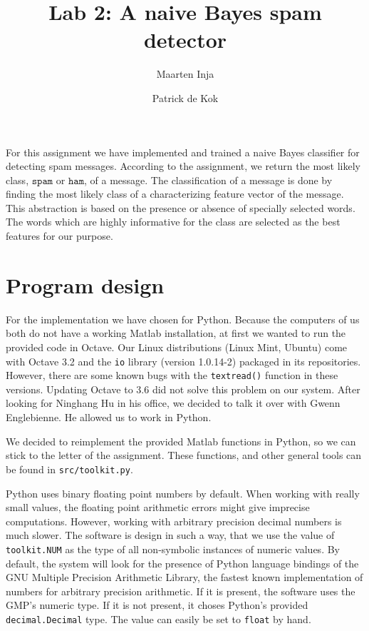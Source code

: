 \documentclass[a4paper,11pt]{article}
\title{Lab 2: A naive Bayes spam detector}
\author{Maarten Inja \and Patrick de Kok}
\newcommand{\cs}{\ensuremath{\mathtt{spam}}}
\newcommand{\ch}{\ensuremath{\mathtt{ham}}}
\begin{document}
\maketitle

For this assignment we have implemented and trained a naive Bayes classifier for detecting spam messages.  According to the assignment, we return the most likely class, $\cs$ or $\ch$, of a message.  The classification of a message is done by finding the most likely class of a characterizing feature vector of the message.  This abstraction is based on the presence or absence of specially selected words.  The words which are highly informative for the class are selected as the best features for our purpose.

\section{Program design}
For the implementation we have chosen for Python.  Because the computers of us both do not have a working Matlab installation, at first we wanted to run the provided code in Octave.  Our Linux distributions (Linux Mint, Ubuntu) come with Octave 3.2 and the \texttt{io} library (version 1.0.14-2) packaged in its repositories.  However, there are some known bugs with the \texttt{textread()} function in these versions.  Updating Octave to 3.6 did not solve this problem on our system.  After looking for Ninghang Hu in his office, we decided to talk it over with Gwenn Englebienne.  He allowed us to work in Python.

We decided to reimplement the provided Matlab functions in Python, so we can stick to the letter of the assignment.  These functions, and other general tools can be found in \texttt{src/toolkit.py}.

Python uses binary floating point numbers by default.  When working with really small values, the floating point arithmetic errors might give imprecise computations.  However, working with arbitrary precision decimal numbers is much slower.  The software is design in such a way, that we use the value of \texttt{toolkit.NUM} as the type of all non-symbolic instances of numeric values.  By default, the system will look for the presence of Python language bindings of the GNU Multiple Precision Arithmetic Library, the fastest known implementation of numbers for arbitrary precision arithmetic.  If it is present, the software uses the GMP's numeric type.  If it is not present, it choses Python's provided \texttt{decimal.Decimal} type.  The value can easily be set to \texttt{float} by hand.
\end{document}
